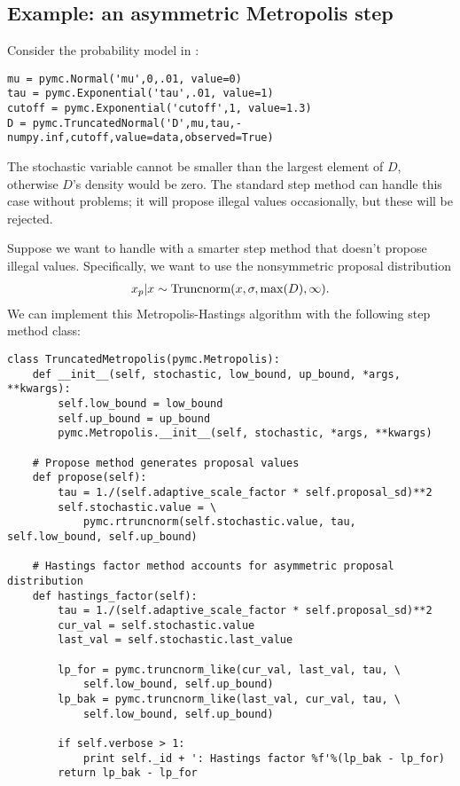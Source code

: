 \subsection{Example: an asymmetric Metropolis step} \label{user-gen}
Consider the probability model in :
\begin{verbatim}
mu = pymc.Normal('mu',0,.01, value=0)
tau = pymc.Exponential('tau',.01, value=1)
cutoff = pymc.Exponential('cutoff',1, value=1.3)
D = pymc.TruncatedNormal('D',mu,tau,-numpy.inf,cutoff,value=data,observed=True)
\end{verbatim}
The stochastic variable  cannot be smaller than the largest element of $D$, otherwise $D$'s density would be zero. The standard  step method can handle this case without problems; it will propose illegal values occasionally, but these will be rejected.

\medskip
Suppose we want to handle  with a smarter step method that doesn't propose illegal values. Specifically, we want to use the nonsymmetric proposal distribution
\begin{eqnarray*}
	x_p | x \sim \textup{Truncnorm}(x, \sigma, \max(D), \infty).
\end{eqnarray*}
We can implement this Metropolis-Hastings algorithm with the following step method class:
\begin{verbatim}
class TruncatedMetropolis(pymc.Metropolis):
    def __init__(self, stochastic, low_bound, up_bound, *args, **kwargs):
        self.low_bound = low_bound
        self.up_bound = up_bound
        pymc.Metropolis.__init__(self, stochastic, *args, **kwargs)

    # Propose method generates proposal values
    def propose(self):
        tau = 1./(self.adaptive_scale_factor * self.proposal_sd)**2
        self.stochastic.value = \
            pymc.rtruncnorm(self.stochastic.value, tau, self.low_bound, self.up_bound)

    # Hastings factor method accounts for asymmetric proposal distribution
    def hastings_factor(self):
        tau = 1./(self.adaptive_scale_factor * self.proposal_sd)**2
        cur_val = self.stochastic.value
        last_val = self.stochastic.last_value

        lp_for = pymc.truncnorm_like(cur_val, last_val, tau, \
            self.low_bound, self.up_bound)
        lp_bak = pymc.truncnorm_like(last_val, cur_val, tau, \
            self.low_bound, self.up_bound)

        if self.verbose > 1:
            print self._id + ': Hastings factor %f'%(lp_bak - lp_for)
        return lp_bak - lp_for
\end{verbatim}

